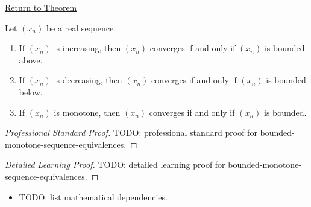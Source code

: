 \newpage
{}
\label{prf:bounded-monotone-sequence-equivalences}

\begin{remark*}[Return]
\hyperref[thm:bounded-monotone-sequence-equivalences]{Return to Theorem}
\end{remark*}

\begin{theorem*}
Let $(x_n)$ be a real sequence.
\begin{enumerate}[label=(\alph*)]
  \item If $(x_n)$ is increasing, then $(x_n)$ converges if and only if
  $(x_n)$ is bounded above.
  \item If $(x_n)$ is decreasing, then $(x_n)$ converges if and only if
  $(x_n)$ is bounded below.
  \item If $(x_n)$ is monotone, then $(x_n)$ converges if and only if
  $(x_n)$ is bounded.
\end{enumerate}

\smallskip
\noindent
\end{theorem*}

\begin{proof}[Professional Standard Proof]
\LRAProofBodyStart
TODO: professional standard proof for bounded-monotone-sequence-equivalences.
\end{proof}

\begin{proof}[Detailed Learning Proof]
\LRAProofBodyStart
TODO: detailed learning proof for bounded-monotone-sequence-equivalences.
\end{proof}

\begin{remark*}
\end{remark*}

\begin{dependencies}
\begin{itemize}
  \item TODO: list mathematical dependencies.
\end{itemize}
\end{dependencies}

\clearpage
